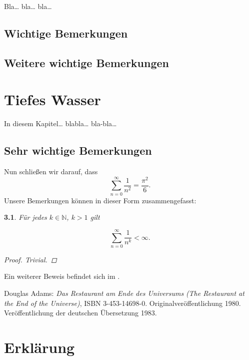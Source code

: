 \documentclass[12pt,a4paper,oneside,naustrian]{amsbook}
\numberwithin{section}{chapter}
\numberwithin{equation}{section}
\numberwithin{figure}{section}
\theoremstyle{plain}
\theoremstyle{plain}
\newtheorem{prop}[thm]{\protect\propositionname}
\providecommand{\propositionname}{Satz}
\begin{document}
Bla\ldots{} bla\ldots{} bla\ldots{} \lipsum[1-10]

\section{Wichtige Bemerkungen}

\lipsum[11-20]

\section{Weitere wichtige Bemerkungen}

\lipsum[21-30]

\chapter{Tiefes Wasser}

In diesem Kapitel\ldots{} blabla\ldots{} bla-bla\ldots{} \lipsum[31]

\section{Sehr wichtige Bemerkungen}

\lipsum[33-35]

Nun schließen wir darauf, dass
\[
\sum_{n=0}^{\infty}\frac{1}{n^{2}}=\frac{\pi^{2}}{6}.
\]
Unsere Bemerkungen können in dieser Form zusammengefasst:
\begin{prop}
Für jedes $k\in\mathbb{N}$, $k>1$ gilt

\[
\sum_{n=0}^{\infty}\frac{1}{n^{k}}<\infty.
\]

\begin{proof}
Trivial.
\end{proof}
\end{prop}

Ein weiterer Beweis befindet sich im \citet{Adams1980}.
\begin{thebibliography}{}
Douglas Adams: \emph{Das Restaurant am Ende
des Universums} \emph{(The Restaurant at the End of the Universe)},
ISBN 3-453-14698-0. Originalveröffentlichung 1980. Veröffentlichung
der deutschen Übersetzung 1983.

\end{thebibliography}

\appendix %

\chapter*{Erklärung} %
\end{document}
